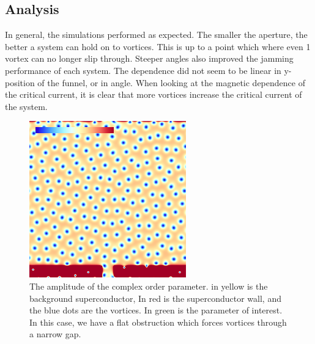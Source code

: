 \subsection{Analysis}
In general, the simulations performed as expected. The smaller the aperture, the better a system can hold on to vortices. This is up to a point which where even 1 vortex can no longer slip through. Steeper angles also improved the jamming performance of each system. The dependence did not seem to be linear in y-position of the funnel, or in angle. When looking at the magnetic dependence of the critical current, it is clear that more vortices increase the critical current of the system.
\begin{figure}[htbp]
\begin{center}
\includegraphics[scale=.50]{ratchetNoAngle.png}
\caption{ The amplitude of the complex order parameter. in yellow is the background superconductor, In red is the superconductor wall, and the blue dots are the vortices. In green is the parameter of interest. In this case, we have a flat obstruction which forces vortices through a narrow gap.}
\label{noAngle}
\end{center}
\end{figure}

